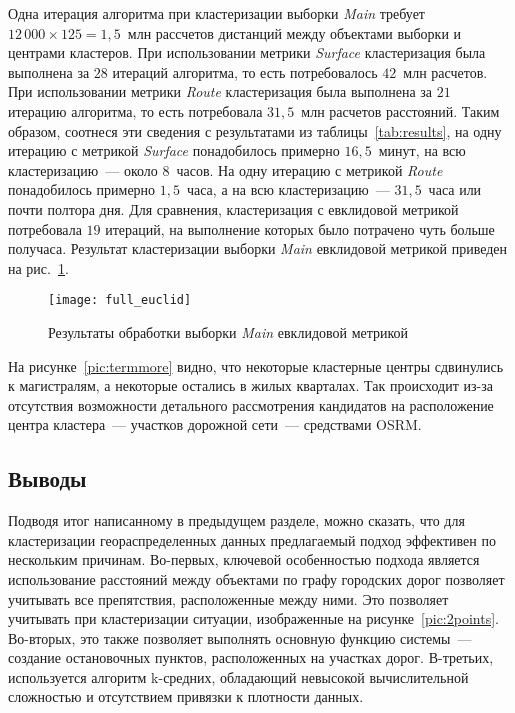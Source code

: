 Одна итерация алгоритма при кластеризации выборки \emph{Main} требует \( 12\,000 \times 125 = 1,\!5 \)~млн рассчетов дистанций между объектами выборки и центрами кластеров. При использовании метрики \emph{Surface} кластеризация была выполнена за \( 28 \) итераций алгоритма, то есть потребовалось \( 42 \)~млн расчетов. При использовании метрики \emph{Route} кластеризация была выполнена за \( 21 \) итерацию алгоритма, то есть потребовала \( 31,\!5 \)~млн расчетов расстояний. Таким образом, соотнеся эти сведения с результатами из таблицы~\ref{tab:results}, на одну итерацию с метрикой \emph{Surface} понадобилось примерно \( 16,\!5 \)~минут, на всю кластеризацию~--- около \( 8 \)~часов. На одну итерацию с метрикой \emph{Route} понадобилось примерно \( 1,\!5 \)~часа, а на всю кластеризацию~--- \( 31,\!5 \)~часа или почти полтора дня. Для сравнения, кластеризация с евклидовой метрикой потребовала \( 19 \) итераций, на выполнение которых было потрачено чуть больше получаса. Результат кластеризации выборки \emph{Main} евклидовой метрикой приведен на рис.~\ref{pic:full-euclid}.
\begin{figure}[h!]
    \centering
    \texttt{[image: full\_euclid]} \\[1ex]
    \parbox{.9\textwidth}{\caption{Результаты обработки выборки \emph{Main} евклидовой метрикой}\label{pic:full-euclid}}
    \vspace*{-1em}
\end{figure}

На рисунке~\ref{pic:termmore} видно, что некоторые кластерные центры сдвинулись к магистралям, а некоторые остались в жилых кварталах. Так происходит из-за отсутствия возможности детального рассмотрения кандидатов на расположение центра кластера~--- участков дорожной сети~--- средствами OSRM.

\subsection{Выводы}
Подводя итог написанному в предыдущем разделе, можно сказать, что для кластеризации геораспределенных данных предлагаемый подход эффективен по нескольким причинам. Во-первых, ключевой особенностью подхода является использование расстояний между объектами по графу городских дорог позволяет учитывать все препятствия, расположенные между ними. Это позволяет учитывать при кластеризации ситуации, изображенные на рисунке~\ref{pic:2points}. Во-вторых, это также позволяет выполнять основную функцию системы~--- создание остановочных пунктов, расположенных на участках дорог. В-третьих, используется алгоритм k-средних, обладающий невысокой вычислительной сложностью и отсутствием привязки к плотности данных.

